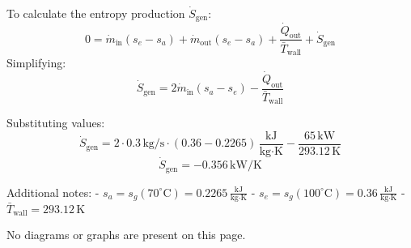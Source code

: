 To calculate the entropy production \( \dot{S}_{\text{gen}} \):  
\[
0 = \dot{m}_{\text{in}} (s_e - s_a) + \dot{m}_{\text{out}} (s_e - s_a) + \frac{\dot{Q}_{\text{out}}}{\bar{T}_{\text{wall}}} + \dot{S}_{\text{gen}}
\]  
Simplifying:  
\[
\dot{S}_{\text{gen}} = 2 \dot{m}_{\text{in}} (s_a - s_e) - \frac{\dot{Q}_{\text{out}}}{\bar{T}_{\text{wall}}}
\]  

Substituting values:  
\[
\dot{S}_{\text{gen}} = 2 \cdot 0.3 \, \text{kg/s} \cdot (0.36 - 0.2265) \, \frac{\text{kJ}}{\text{kg·K}} - \frac{65 \, \text{kW}}{293.12 \, \text{K}}
\]  
\[
\dot{S}_{\text{gen}} = -0.356 \, \text{kW/K}
\]  

Additional notes:  
- \( s_a = s_g(70^\circ\text{C}) = 0.2265 \, \frac{\text{kJ}}{\text{kg·K}} \)  
- \( s_e = s_g(100^\circ\text{C}) = 0.36 \, \frac{\text{kJ}}{\text{kg·K}} \)  
- \( \bar{T}_{\text{wall}} = 293.12 \, \text{K} \)  

No diagrams or graphs are present on this page.